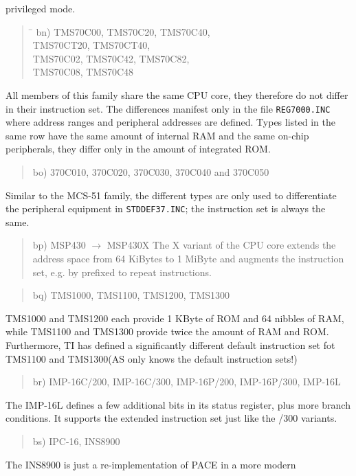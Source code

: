\documentclass[12pt,twoside]{report}
\newcommand{\tty}[1]{{\tt #1}}
\newcommand{\asname}{{AS}}
\begin{document}
privileged mode.
\begin{quote}
\begin{tabbing}
\hspace{0.7cm} \= \kill
bn) \> TMS70C00, TMS70C20, TMS70C40,\\
    \> TMS70CT20, TMS70CT40,\\
    \> TMS70C02, TMS70C42, TMS70C82,\\
    \> TMS70C08, TMS70C48\\
\end{tabbing}
\end{quote}
All members of this family share the same CPU core, they therefore do not
differ in their instruction set.  The differences manifest only in the
file \tty{REG7000.INC} where address ranges and peripheral addresses are
defined.  Types listed in the same row have the same amount of internal
RAM and the same on-chip peripherals, they differ only in the amount of
integrated ROM.
\begin{quote}
bo) 370C010, 370C020, 370C030, 370C040 and 370C050
\end{quote}
Similar to the MCS-51 family, the different types are only used to
differentiate the peripheral equipment in \tty{STDDEF37.INC}; the
instruction set is always the same.
\begin{quote}
bp) MSP430 $\rightarrow$ MSP430X
The X variant of the CPU core extends the address space from 64
KiBytes to 1 MiByte and augments the instruction set, e.g. by
prefixed to repeat instructions.
\end{quote}
\begin{quote}
bq) TMS1000, TMS1100, TMS1200, TMS1300
\end{quote}
TMS1000 and TMS1200 each provide 1 KByte of ROM and 64 nibbles of
RAM, while TMS1100 and TMS1300 provide twice the amount of RAM
and ROM.  Furthermore, TI has defined a significantly different
default instruction set fot TMS1100 and TMS1300(\asname{} only knows the
default instruction sets!)
\begin{quote}
br) IMP-16C/200, IMP-16C/300, IMP-16P/200, IMP-16P/300, IMP-16L
\end{quote}
The IMP-16L defines a few additional bits in its status register,
plus more branch conditions.  It supports the extended instruction
set just like the /300 variants.
\begin{quote}
bs) IPC-16, INS8900
\end{quote}
The INS8900 is just a re-implementation of PACE in a more modern
\end{document}
